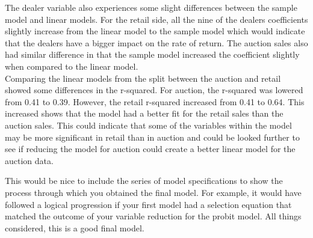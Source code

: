 \documentclass{paper}
\begin{document}
The dealer variable also experiences some slight differences between the sample model and linear models.  For the retail side, all the nine of the dealers coefficients slightly increase from the linear model to the sample model which would indicate that the dealers have a bigger impact on the rate of return.  The auction sales also had similar difference in that the sample model increased the coefficient slightly when compared to the linear model.
\\
Comparing the linear models from the split between the auction and retail showed some differences in the r-squared.  For auction, the r-squared was lowered from 0.41 to 0.39.  However, the retail r-squared increased from 0.41 to 0.64.  This increased shows that the model had a better fit for the retail sales than the auction sales.  This could indicate that some of the variables within the model may be more significant in retail than in auction and could be looked further to see if reducing the model for auction could create a better linear model for the auction data.




{\color{red}
This would be nice to include the series of model specifications
to show the process through which you obtained the final model.
For example, it would have followed a logical progression if 
your first model had a selection equation that matched the outcome
of your variable reduction for the probit model. 
All things considered, this is a good final model.
}
\end{document}
